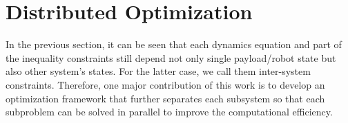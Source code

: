 \section{Distributed Optimization}
\label{sec:approach}

In the previous section, it can be seen that each dynamics equation and part of the inequality constraints still depend not only single payload/robot state but also other system's states. For the latter case, we call them inter-system constraints. Therefore, one major contribution of this work is to develop an optimization framework that further separates each subsystem so that each subproblem can be solved in parallel to improve the computational efficiency.

